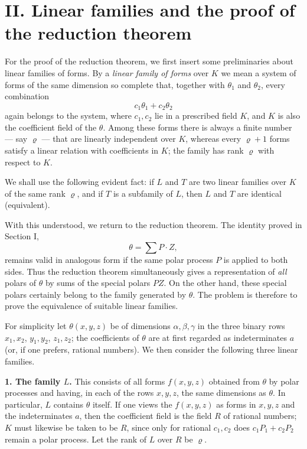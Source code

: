 \documentclass[11pt]{article}
\begin{document}
\section*{II. Linear families and the proof of the reduction theorem}

For the proof of the reduction theorem, we first insert some preliminaries about linear families of forms. By a \emph{linear family of forms} over \(K\) we mean a system of forms of the same dimension so complete that, together with \(\theta_1\) and \(\theta_2\), every combination
\[
c_1\theta_1+c_2\theta_2
\]
again belongs to the system, where \(c_1,c_2\) lie in a prescribed field \(K\), and \(K\) is also the coefficient field of the \(\theta\). Among these forms there is always a finite number --- say \(\varrho\) --- that are linearly independent over \(K\), whereas every \(\varrho+1\) forms satisfy a linear relation with coefficients in \(K\); the family has rank \(\varrho\) with respect to \(K\).

We shall use the following evident fact: if \(L\) and \(T\) are two linear families over \(K\) of the same rank \(\varrho\), and if \(T\) is a subfamily of \(L\), then \(L\) and \(T\) are identical (equivalent).

With this understood, we return to the reduction theorem. The identity proved in Section I,
\[
\theta=\sum P\cdot Z,
\tag{1}
\]
remains valid in analogous form if the same polar process \(P\) is applied to both sides. Thus the reduction theorem simultaneously gives a representation of \emph{all} polars of \(\theta\) by sums of the special polars \(PZ\). On the other hand, these special polars certainly belong to the family generated by \(\theta\). The problem is therefore to prove the equivalence of suitable linear families.

For simplicity let \(\theta(x,y,z)\) be of dimensions \(\alpha,\beta,\gamma\) in the three binary rows \(x_1,x_2\), \(y_1,y_2\), \(z_1,z_2\); the coefficients of \(\theta\) are at first regarded as indeterminates \(a\) (or, if one prefers, rational numbers). We then consider the following three linear families.

\medskip
\noindent\textbf{1. The family \(L\).}
This consists of all forms \(f(x,y,z)\) obtained from \(\theta\) by polar processes and having, in each of the rows \(x,y,z\), the same dimensions as \(\theta\). In particular, \(L\) contains \(\theta\) itself. If one views the \(f(x,y,z)\) as forms in \(x,y,z\) and the indeterminates \(a\), then the coefficient field is the field \(R\) of rational numbers; \(K\) must likewise be taken to be \(R\), since only for rational \(c_1,c_2\) does \(c_1P_1+c_2P_2\) remain a polar process. Let the rank of \(L\) over \(R\) be \(\varrho\).
\end{document}
